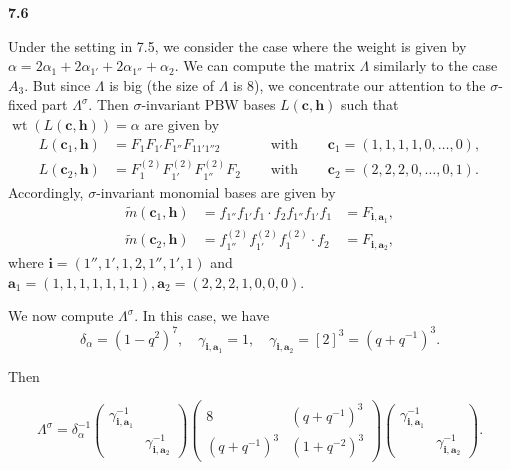 \documentclass[12pt]{amsart}
\renewcommand\a{\alpha}
\newcommand\g{\gamma}
\renewcommand\d{\delta}
\newcommand\s{\sigma}
\newcommand\vL{\varLambda}
\renewcommand{\1}{\mathbb 1}
\newcommand\Bh{\mathbf h}
\newcommand\Bi{\mathbf i}
\newcommand\Ba{\mathbf a}
\newcommand\Bc{\mathbf c}
\newcommand\iv{^{-1}}
\newcommand\wt{\widetilde}
\newcommand\weit{\operatorname{wt}}
\numberwithin{equation}{section}
\def \para#1{\par\medskip\textbf{#1}
              \addtocounter{thm}{1}}
\begin{document}
\para{7.6}
Under the setting in 7.5, we consider the case where the weight is given by
$\a = 2\a_1 + 2\a_{1'} + 2\a_{1''} + \a_2$. We can compute the matrix $\vL$
similarly to the case $A_3$.
But since $\vL$ is big (the size of $\vL$ is 8),
we concentrate our attention to the $\s$-fixed part
$\vL^{\s}$.
Then $\s$-invariant PBW bases $L(\Bc, \Bh)$ such that $\weit (L(\Bc,\Bh)) = \a$ are given by
\begin{equation*}
\begin{aligned}
  L(\Bc_1, \Bh) &= F_1F_{1'}F_{1''}F_{11'1''2}  &\quad\text{ with } &\quad
                   \Bc_1 = (1,1,1,1, 0, \dots, 0), \\
L(\Bc_2, \Bh) &= F_1^{(2)}F_{1'}^{(2)}F_{1''}^{(2)}F_2 &\quad\text{ with } &\quad
                    \Bc_2 = (2,2,2, 0,\dots, 0,1).
\end{aligned}
\end{equation*}
Accordingly, $\s$-invariant monomial bases are given by
\begin{equation*}
\begin{aligned}
  \wt m(\Bc_1, \Bh) &= f_{1''}f_{1'}f_1\cdot f_2f_{1''}f_{1'}f_1 &= F_{\Bi, \Ba_1}, \\
  \wt m(\Bc_2, \Bh) &= f_{1''}^{(2)}f_{1'}^{(2)}f_1^{(2)}\cdot f_2 &= F_{\Bi, \Ba_2},
\end{aligned}
\end{equation*}
where $\Bi = (1'',1',1,2,1'',1',1)$ and $\Ba_ 1= (1,1,1,1,1,1,1), \Ba_2 = (2,2,2,1,0,0,0)$. 
\par
We now compute $\vL^{\s}$. In this case, we have
\begin{equation*}
\d_{\a} = (1-q^2)^7, \quad \g_{\Bi, \Ba_1} = 1, \quad \g_{\Bi, \Ba_2} = [2]^3 = (q + q\iv)^3.
\end{equation*}

Then

\begin{equation*}
\tag{7.6.1}  
  \vL^{\s} = \d_{\a}\iv \begin{pmatrix} 
                         \g_{\Bi, \Ba_1}\iv  &    \\
                                 &   \g_{\Bi, \Ba_2}\iv
                         \end{pmatrix}
                         \begin{pmatrix}
                                  8  &  (q + q\iv)^3  \\
                         (q + q\iv)^3  & (1 + q^{-2})^3
                         \end{pmatrix}
                         \begin{pmatrix}
                               \g_{\Bi, \Ba_1}\iv  &    \\
                                   &    \g_{\Bi,\Ba_2}\iv
                         \end{pmatrix}.      
\end{equation*}
\end{document}
